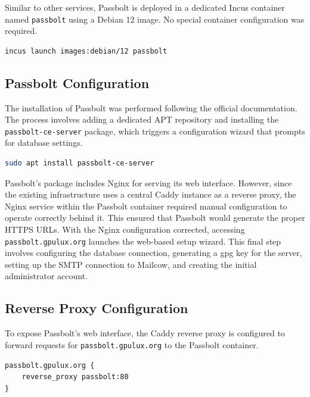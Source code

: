 Similar to other services, Passbolt is deployed in a dedicated Incus container named \texttt{passbolt} using a Debian 12 image. No special container configuration was required.

\begin{lstlisting}[language=bash,caption={Command to create the Passbolt container}]
incus launch images:debian/12 passbolt
\end{lstlisting}

\subsection*{Passbolt Configuration}

The installation of Passbolt was performed following the official documentation\cite{passbolt-install-debian}. The process involves adding a dedicated APT repository and installing the \texttt{passbolt-ce-server} package, which triggers a configuration wizard that prompts for database settings.

\begin{lstlisting}[language=bash,caption={Command to install the Passbolt CE server package}]
sudo apt install passbolt-ce-server
\end{lstlisting}

Passbolt's package includes Nginx for serving its web interface. However, since the existing infrastructure uses a central Caddy instance as a reverse proxy, the Nginx service within the Passbolt container required manual configuration to operate correctly behind it. This ensured that Passbolt would generate the proper HTTPS URLs.
With the Nginx configuration corrected, accessing \texttt{passbolt.gpulux.org} launches the web-based setup wizard. This final step involves configuring the database connection, generating a \gls{gpg} key for the server, setting up the SMTP connection to Mailcow, and creating the initial administrator account.

\subsection*{Reverse Proxy Configuration}

To expose Passbolt's web interface, the Caddy reverse proxy is configured to forward requests for \texttt{passbolt.gpulux.org} to the Passbolt container.

\begin{lstlisting}[caption={Caddyfile configuration used to expose Passbolt via the reverse proxy}]
passbolt.gpulux.org {
    reverse_proxy passbolt:80
}
\end{lstlisting}

